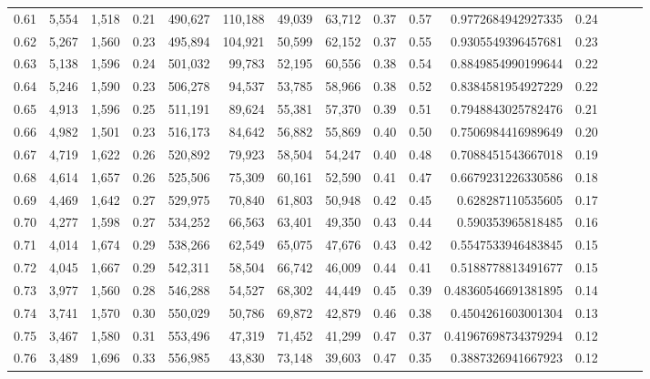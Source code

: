 \begin{tabular}{rrrrrrrrrrrrrrr}
0.61 &   5,554 &  1,518 &  0.21 &  490,627 &  110,188 &   49,039 &   63,712 &  0.37 &  0.57 &    0.9772684942927335 &      0.24 \\
0.62 &   5,267 &  1,560 &  0.23 &  495,894 &  104,921 &   50,599 &   62,152 &  0.37 &  0.55 &    0.9305549396457681 &      0.23 \\
0.63 &   5,138 &  1,596 &  0.24 &  501,032 &   99,783 &   52,195 &   60,556 &  0.38 &  0.54 &    0.8849854990199644 &      0.22 \\
0.64 &   5,246 &  1,590 &  0.23 &  506,278 &   94,537 &   53,785 &   58,966 &  0.38 &  0.52 &    0.8384581954927229 &      0.22 \\
0.65 &   4,913 &  1,596 &  0.25 &  511,191 &   89,624 &   55,381 &   57,370 &  0.39 &  0.51 &    0.7948843025782476 &      0.21 \\
0.66 &   4,982 &  1,501 &  0.23 &  516,173 &   84,642 &   56,882 &   55,869 &  0.40 &  0.50 &    0.7506984416989649 &      0.20 \\
0.67 &   4,719 &  1,622 &  0.26 &  520,892 &   79,923 &   58,504 &   54,247 &  0.40 &  0.48 &    0.7088451543667018 &      0.19 \\
0.68 &   4,614 &  1,657 &  0.26 &  525,506 &   75,309 &   60,161 &   52,590 &  0.41 &  0.47 &    0.6679231226330586 &      0.18 \\
0.69 &   4,469 &  1,642 &  0.27 &  529,975 &   70,840 &   61,803 &   50,948 &  0.42 &  0.45 &     0.628287110535605 &      0.17 \\
0.70 &   4,277 &  1,598 &  0.27 &  534,252 &   66,563 &   63,401 &   49,350 &  0.43 &  0.44 &     0.590353965818485 &      0.16 \\
0.71 &   4,014 &  1,674 &  0.29 &  538,266 &   62,549 &   65,075 &   47,676 &  0.43 &  0.42 &    0.5547533946483845 &      0.15 \\
0.72 &   4,045 &  1,667 &  0.29 &  542,311 &   58,504 &   66,742 &   46,009 &  0.44 &  0.41 &    0.5188778813491677 &      0.15 \\
0.73 &   3,977 &  1,560 &  0.28 &  546,288 &   54,527 &   68,302 &   44,449 &  0.45 &  0.39 &   0.48360546691381895 &      0.14 \\
0.74 &   3,741 &  1,570 &  0.30 &  550,029 &   50,786 &   69,872 &   42,879 &  0.46 &  0.38 &    0.4504261603001304 &      0.13 \\
0.75 &   3,467 &  1,580 &  0.31 &  553,496 &   47,319 &   71,452 &   41,299 &  0.47 &  0.37 &   0.41967698734379294 &      0.12 \\
0.76 &   3,489 &  1,696 &  0.33 &  556,985 &   43,830 &   73,148 &   39,603 &  0.47 &  0.35 &    0.3887326941667923 &      0.12 \\

\end{tabular}

